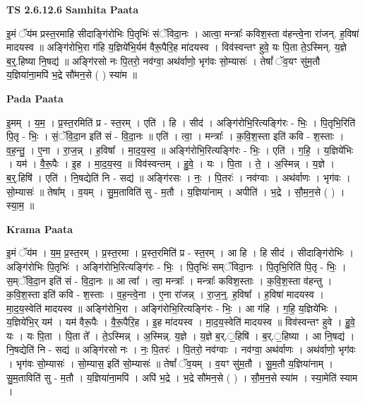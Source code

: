 \documentclass[17pt]{extarticle}
\begin{document}
\textbf{TS 2.6.12.6 } \newline
\textbf{Samhita Paata} \newline

इ॒मं ॅय॑म प्रस्त॒रमाहि सीदाङ्गि॑रोभिः पि॒तृभिः॑ संॅविदा॒नः । आत्वा॒ मन्त्राः᳚ कविश॒स्ता व॑हन्त्वे॒ना रा॑जन्. ह॒विषा॑ मादयस्व ॥ अङ्गि॑रोभि॒रा ग॑हि य॒ज्ञिये॑भि॒र्यम॑ वैरू॒पैरि॒ह मा॑दयस्व । विव॑स्वन्तꣳ हुवे॒ यः पि॒ता ते॒ऽस्मिन्. य॒ज्ञे ब॒र्॒.हिष्या नि॒षद्य॑ ॥ अङ्गि॑रसो नः पि॒तरो॒ नव॑ग्वा॒ अथ॑र्वाणो॒ भृग॑वः सो॒म्यासः॑ । तेषां᳚ ॅव॒यꣳ सु॑म॒तौ य॒ज्ञिया॑ना॒मपि॑ भ॒द्रे सौ॑मन॒से ( ) स्या॑म ॥ \newline

\textbf{Pada Paata} \newline

इ॒मम् । य॒म॒ । प्र॒स्त॒रमिति॑ प्र - स्त॒रम् । एति॑ । हि । सीद॑ । अङ्गि॑रोभि॒रित्यङ्गि॑रः - भिः॒ । पि॒तृभि॒रिति॑ पि॒तृ - भिः॒ । सं॒ॅवि॒दा॒न इति॑ सं - वि॒दा॒नः ॥ एति॑ । त्वा॒ । मन्त्राः᳚ । क॒वि॒श॒स्ता इति॑ कवि - श॒स्ताः । व॒ह॒न्तु॒ । ए॒ना । रा॒ज॒न्न् । ह॒विषा᳚ । मा॒द॒य॒स्व॒ ॥ अङ्गि॑रोभि॒रित्यङ्गि॑रः - भिः॒ । एति॑ । ग॒हि॒ । य॒ज्ञिये॑भिः । यम॑ । वै॒रू॒पैः । इ॒ह । मा॒द॒य॒स्व॒ ॥ विव॑स्वन्तम् । हु॒वे॒ । यः । पि॒ता । ते॒ । अ॒स्मिन्न् । य॒ज्ञे । ब॒र्॒.हिषि॑ । एति॑ । नि॒षद्येति॑ नि - सद्य॑ ॥ अङ्गि॑रसः । नः॒ । पि॒तरः॑ । नव॑ग्वाः । अथ॑र्वाणः । भृग॑वः । सो॒म्यासः॑ ॥ तेषा᳚म् । व॒यम् । सु॒म॒ताविति॑ सु - म॒तौ । य॒ज्ञिया॑नाम् । अपीति॑ । भ॒द्रे । सौ॒म॒न॒से ( ) । स्या॒म॒ ॥  \newline


\textbf{Krama Paata} \newline

इ॒मं ॅय॑म । य॒म॒ प्र॒स्त॒रम् । प्र॒स्त॒रमा । प्र॒स्त॒रमिति॑ प्र - स्त॒रम् । आ हि । हि सीद॑ । सीदाङ्गि॑रोभिः । अङ्गि॑रोभिः पि॒तृभिः॑ । अङ्गि॑रोभि॒रित्यङ्गि॑रः - भिः॒ । पि॒तृभिः॑ सम्ॅविदा॒नः । पि॒तृभि॒रिति॑ पि॒तृ - भिः॒ । स॒म्ॅवि॒दा॒न इति॑ सं - वि॒दा॒नः ॥ आ त्वा᳚ । त्वा॒ मन्त्राः᳚ । मन्त्राः᳚ कविश॒स्ताः । क॒वि॒श॒स्ता व॑हन्तु । क॒वि॒श॒स्ता इति॑ कवि - श॒स्ताः । व॒ह॒न्त्वे॒ना । ए॒ना रा॑जन्न् । रा॒ज॒न्॒. ह॒विषा᳚ । ह॒विषा॑ मादयस्व । मा॒द॒य॒स्वेति॑ मादयस्व ॥ अङ्गि॑रोभि॒रा । अङ्गि॑रोभि॒रित्यङ्गि॑रः - भिः॒ । आ ग॑हि । ग॒हि॒ य॒ज्ञिये॑भिः । य॒ज्ञिये॑भि॒र् यम॑ । यम॑ वैरू॒पैः । वै॒रू॒पैरि॒ह । इ॒ह मा॑दयस्व । मा॒द॒य॒स्वेति॑ मादयस्व ॥ विव॑स्वन्तꣳ हुवे । हु॒वे॒ यः । यः पि॒ता । पि॒ता ते᳚ । ते॒ऽस्मिन्न् । अ॒स्मिन्न्. य॒ज्ञे । य॒ज्ञे ब॒र्.॒हिषि॑ । ब॒र्.॒हिष्या । आ नि॒षद्य॑ । नि॒षद्येति॑ नि - सद्य॑ ॥ अङ्गि॑रसो नः । नः॒ पि॒तरः॑ । पि॒तरो॒ नव॑ग्वाः । नव॑ग्वा॒ अथ॑र्वाणः । अथ॑र्वाणो॒ भृग॑वः । भृग॑वः सो॒म्यासः॑ । सो॒म्यास॒ इति॑ सो॒म्यासः॑ ॥ तेषां᳚ ॅव॒यम् । व॒यꣳ सु॑म॒तौ । सु॒म॒तौ य॒ज्ञिया॑नाम् । सु॒म॒ताविति॑ सु - म॒तौ । य॒ज्ञिया॑ना॒मपि॑ । अपि॑ भ॒द्रे । भ॒द्रे सौ॑मन॒से ( ) । सौ॒म॒न॒से स्या॑म । स्या॒मेति॑ स्याम । \newline
\end{document}
